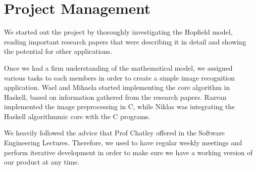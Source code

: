 \chapter{Project Management}



We started out the project by thoroughly investigating the Hopfield model, reading important research papers that were describing it in detail and showing the potential for other applications. 

Once we had a firm understanding of the mathematical model, we assigned various tasks to each members in order to create a simple image recognition application. Wael and Mihaela started implementing the core algorithm in Haskell, based on information gathered from the research papers. Razvan implemented the image preprocessing in C, while Niklas was integrating the Haskell algorithmmic core with the C programs. 

We heavily followed the advice that Prof Chatley offered in the Software Engineering Lectures. Therefore, we used to have regular weekly meetings and perform iterative development in order to make sure we have a working version of our product at any time.